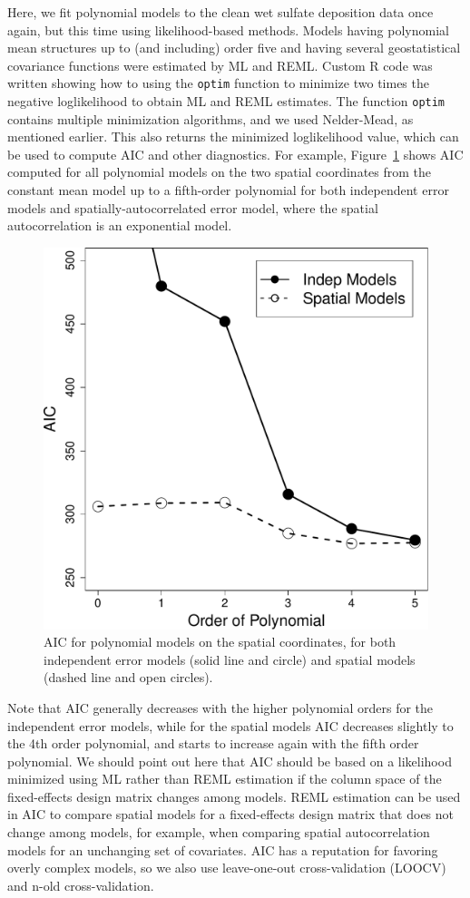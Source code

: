 \documentclass[12pt, titlepage]{article}
\begin{document}
Here, we fit polynomial models to the clean wet sulfate deposition data once again, but this time using likelihood-based methods.  Models having polynomial mean structures up to (and including) order five and having several geostatistical covariance functions were estimated by ML and REML.  Custom R code was written showing how to using the \texttt{optim} function to minimize two times the negative loglikelihood to obtain ML and REML estimates.  The function \texttt{optim} contains multiple minimization algorithms, and we used Nelder-Mead, as mentioned earlier.  This also returns the minimized loglikelihood value, which can be used to compute AIC and other diagnostics.  For example, Figure~\ref{Fig:SO4_AIC} shows AIC computed for all polynomial models on the two spatial coordinates from the constant mean model up to a fifth-order polynomial for both independent error models and spatially-autocorrelated error model, where the spatial autocorrelation is an exponential model.
\begin{figure}[h]
  \begin{center}
	    \includegraphics[width=.5\linewidth]{SO4_AIC}
  \end{center}
  \caption{AIC for polynomial models on the spatial coordinates, for both independent error models (solid line and circle) and spatial models (dashed line and open circles). \label{Fig:SO4_AIC}}
\end{figure}
Note that AIC generally decreases with the higher polynomial orders for the independent error models, while for the spatial models AIC decreases slightly to the 4th order polynomial, and starts to increase again with the fifth order polynomial.  We should point out here that AIC should be based on a likelihood minimized using ML rather than REML estimation if the column space of the fixed-effects design matrix changes among models.  REML estimation can be used in AIC to compare spatial models for a fixed-effects design matrix that does not change among models, for example, when comparing spatial autocorrelation models for an unchanging set of covariates.  AIC has a reputation for favoring overly complex models, so we also use leave-one-out cross-validation (LOOCV) and n-old cross-validation.
\end{document}
